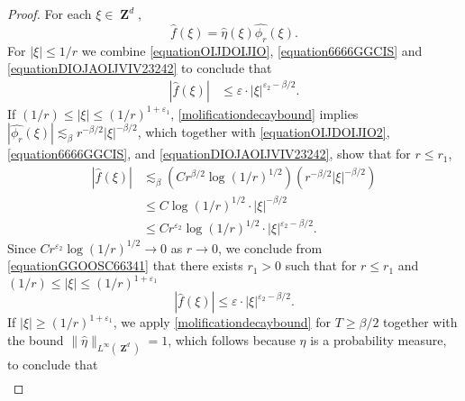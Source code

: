 \documentclass[dvipsnames,letterpaper,12pt]{article}
\numberwithin{equation}{section}
\DeclareMathOperator{\ZZ}{\mathbf{Z}}
\numberwithin{theorem}{section}
\begin{document}
\begin{proof}
    For each $\xi \in \ZZ^d$,
    \begin{equation} \label{equation6666GGCIS}
        \widehat{f}(\xi) = \widehat{\eta}(\xi) \widehat{\phi_r}(\xi).
    \end{equation}
    For $|\xi| \leq 1/r$ we combine \eqref{equationOIJDOIJIO}, \eqref{equation6666GGCIS} and \eqref{equationDIOJAOIJVIV23242} to conclude that
    \begin{equation} \label{equationGGIOHISI99234}
    \begin{split}
        |\widehat{f}(\xi)| &\leq \varepsilon \cdot |\xi|^{\varepsilon_2 - \beta/2}.
    \end{split}
    \end{equation}
    If $(1/r) \leq |\xi| \leq (1/r)^{1+\varepsilon_1}$, \eqref{molificationdecaybound} implies $|\widehat{\phi_{r}}(\xi)| \lesssim_\beta r^{-\beta/2} |\xi|^{-\beta/2}$, which together with \eqref{equationOIJDOIJIO2}, \eqref{equation6666GGCIS}, and \eqref{equationDIOJAOIJVIV23242}, show that for $r \leq r_1$,
    \begin{equation} \label{equationGGOOSC66341}
    \begin{split}
        |\widehat{f}(\xi)| &\lesssim_\beta \left( C r^{\beta/2} \log(1/r)^{1/2} \right) \left( r^{-\beta/2} |\xi|^{-\beta/2} \right)\\
        &\leq C \log(1/r)^{1/2} \cdot |\xi|^{-\beta/2}\\
        &\leq C r^{\varepsilon_2} \log(1/r)^{1/2} \cdot |\xi|^{\varepsilon_2-\beta/2}.
    \end{split}
    \end{equation}
    Since $C r^{\varepsilon_2} \log(1/r)^{1/2} \to 0$ as $r \to 0$, we conclude from \eqref{equationGGOOSC66341} that there exists $r_1 > 0$ such that for $r \leq r_1$ and $(1/r) \leq |\xi| \leq (1/r)^{1 + \varepsilon_1}$
    \begin{equation} \label{equationUUUDDDCII777}
        |\widehat{f}(\xi)| \leq \varepsilon \cdot |\xi|^{\varepsilon_2-\beta/2}.
    \end{equation}
    If $|\xi| \geq (1/r)^{1 + \varepsilon_1}$, we apply \eqref{molificationdecaybound} for $T \geq \beta/2$ together with the bound $\| \widehat{\eta} \|_{L^\infty(\ZZ^d)} = 1$, which follows because $\eta$ is a probability measure, to conclude that
    \begin{equation} \label{equationGGUSCCCYVSSXX998723}
    \begin{split}

\end{split}
\end{equation}
\end{proof}
\end{document}
